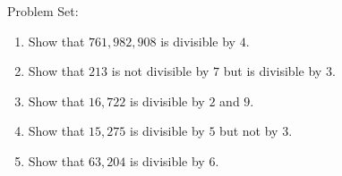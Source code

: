 \documentclass[16pt]{article}
\theoremstyle{remark}
\begin{document}
Problem Set:
\begin{enumerate}
\item Show that $761,982,908$ is divisible by $4$.
\vspace{3cm}
\item Show that $213$ is not divisible by $7$ but is divisible by $3$.
\vspace{3cm}
\item Show that $16,722$ is divisible by $2$ and $9$.
\vspace{3cm}
\newpage
\item Show that $15,275$ is divisible by $5$ but not by $3$.
\vspace{3cm}
\item Show that $63,204$ is divisible by $6$. 
\end{enumerate}
\end{document}
